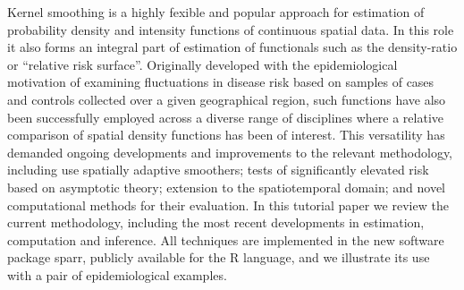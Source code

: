 

Kernel smoothing is a highly fexible and popular approach for estimation of probability density and intensity functions of continuous spatial data. In this role it also forms an integral part of estimation of functionals such as the density-ratio or ``relative risk surface''. Originally developed with the epidemiological motivation of examining fluctuations in disease risk based on samples of cases and controls collected over a given geographical region, such functions have also been successfully employed across a diverse range of disciplines where a relative comparison of spatial density functions has been of interest. This versatility has demanded ongoing developments and improvements to the relevant methodology, including use spatially adaptive smoothers; tests of significantly elevated risk based on asymptotic theory; extension to the spatiotemporal domain; and novel computational methods for their evaluation. In this tutorial paper we review the current methodology, including the most recent developments in estimation, computation and inference. All techniques are implemented in the new software package sparr, publicly available for the R language, and we illustrate its use with a pair of epidemiological examples. \citep{davies2018tutorial}

